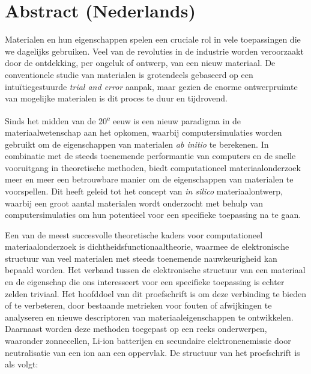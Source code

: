 \chapter*{Abstract (Nederlands)} \label{chapter:abstract_nederlands}

Materialen en hun eigenschappen spelen een cruciale rol in vele toepassingen die we dagelijks gebruiken. Veel van de revoluties in de industrie worden veroorzaakt door de ontdekking, per ongeluk of ontwerp, van een nieuw materiaal. De conventionele studie van materialen is grotendeels gebaseerd op een intu\"itiegestuurde \textit{trial and error} aanpak, maar gezien de enorme ontwerpruimte van mogelijke materialen is dit proces te duur en tijdrovend.

Sinds het midden van de 20\textsuperscript{e} eeuw is een nieuw paradigma in de materiaalwetenschap aan het opkomen, waarbij computersimulaties worden gebruikt om de eigenschappen van materialen \textit{ab initio} te berekenen. In combinatie met de steeds toenemende performantie van computers en de snelle vooruitgang in theoretische methoden, biedt computationeel materiaalonderzoek meer en meer een betrouwbare manier om de eigenschappen van materialen te voorspellen. Dit heeft geleid tot het concept van \textit{in silico} materiaalontwerp, waarbij een groot aantal materialen wordt onderzocht met behulp van computersimulaties om hun potentieel voor een specifieke toepassing na te gaan.

Een van de meest succesvolle theoretische kaders voor computationeel materiaalonderzoek is dichtheidsfunctionaaltheorie, waarmee de elektronische structuur van veel materialen met steeds toenemende nauwkeurigheid kan bepaald worden. Het verband tussen de elektronische structuur van een materiaal en de eigenschap die ons interesseert voor een specifieke toepassing is echter zelden triviaal. Het hoofddoel van dit proefschrift is om deze verbinding te bieden of te verbeteren, door bestaande metrieken voor fouten of afwijkingen te analyseren en nieuwe descriptoren van materiaaleigenschappen te ontwikkelen. Daarnaast worden deze methoden toegepast op een reeks onderwerpen, waaronder zonnecellen, Li-ion batterijen en secundaire elektronenemissie door neutralisatie van een ion aan een oppervlak. De structuur van het proefschrift is als volgt:

